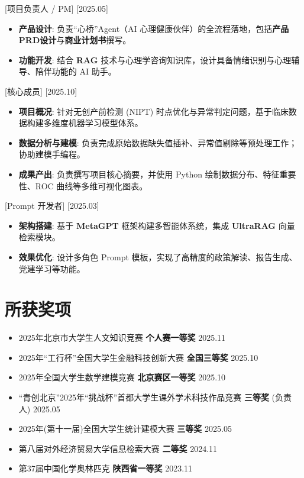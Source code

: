 \documentclass{resume}
\begin{document}
[项目负责人 / PM]  
[2025.05]  
\begin{itemize}  
  \item \textbf{产品设计}: 负责“心桥”Agent（AI 心理健康伙伴）的全流程落地，包括\textbf{产品PRD设计}与\textbf{商业计划书}撰写。  
  \item \textbf{功能开发}: 结合 \textbf{RAG} 技术与心理学咨询知识库，设计具备情绪识别与心理辅导、陪伴功能的 AI 助手。
\end{itemize}

[核心成员]
[2025.10]
\begin{itemize}
  \item \textbf{项目概况}: 针对无创产前检测 (NIPT) 时点优化与异常判定问题，基于临床数据构建多维度机器学习模型体系。
  \item \textbf{数据分析与建模}: 负责完成原始数据缺失值插补、异常值剔除等预处理工作；协助建模手编程。
  \item \textbf{成果产出}: 负责撰写项目核心摘要，并使用 Python 绘制数据分布、特征重要性、ROC 曲线等多维可视化图表。
\end{itemize}

[Prompt 开发者]  
[2025.03]  
\begin{itemize}  
  \item \textbf{架构搭建}: 基于 \textbf{MetaGPT} 框架构建多智能体系统，集成 \textbf{UltraRAG} 向量检索模块。  
  \item \textbf{效果优化}: 设计多角色 Prompt 模板，实现了高精度的政策解读、报告生成、党建学习等功能。  
\end{itemize}

\section{所获奖项}
\begin{itemize}[leftmargin=1.5em, parsep=0pt, itemsep=2pt]
  \item 2025年北京市大学生人文知识竞赛 \textbf{个人赛一等奖} \hfill 2025.11
  \item 2025年“工行杯”全国大学生金融科技创新大赛 \textbf{全国三等奖} \hfill 2025.10
  \item 2025年全国大学生数学建模竞赛 \textbf{北京赛区一等奖} \hfill 2025.10
  \item “青创北京”2025年“挑战杯”首都大学生课外学术科技作品竞赛 \textbf{三等奖} (负责人) \hfill 2025.05
  \item 2025年(第十一届)全国大学生统计建模大赛 \textbf{三等奖} \hfill 2025.05
  \item 第八届对外经济贸易大学信息检索大赛 \textbf{二等奖} \hfill 2024.11
  \item 第37届中国化学奥林匹克 \textbf{陕西省一等奖} \hfill 2023.11
\end{itemize}
\end{document}

